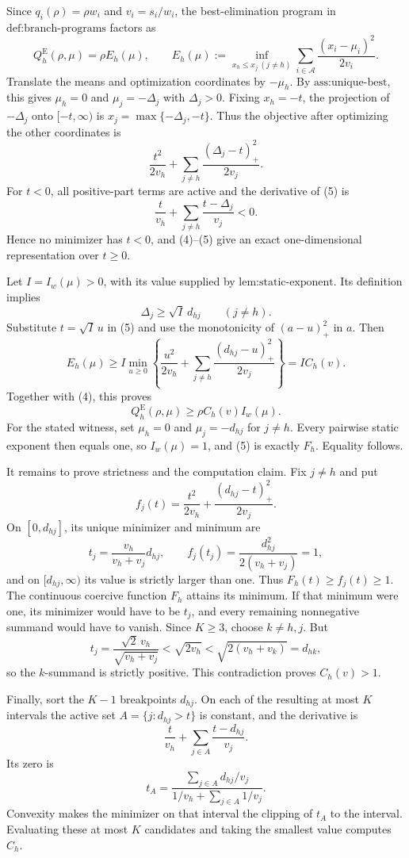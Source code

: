Since \(q_i(\rho)=\rho w_i\) and \(v_i=s_i/w_i\), the best-elimination program in \(\text{def:branch-programs}\) factors as
\[
 Q_h^{\mathrm E}(\rho,\mu)=\rho E_h(\mu),\qquad
 E_h(\mu):=\inf_{x_h\leq x_j\ (j\ne h)}
 \sum_{i\in\mathcal A}\frac{(x_i-\mu_i)^2}{2v_i}. \tag{4}
\]
Translate the means and optimization coordinates by \(-\mu_h\). By \(\text{ass:unique-best}\), this gives \(\mu_h=0\) and \(\mu_j=-\Delta_j\) with \(\Delta_j>0\). Fixing \(x_h=-t\), the projection of \(-\Delta_j\) onto \([-t,\infty)\) is \(x_j=\max\{-\Delta_j,-t\}\). Thus the objective after optimizing the other coordinates is
\[
 \frac{t^2}{2v_h}+\sum_{j\ne h}\frac{(\Delta_j-t)_+^2}{2v_j}. \tag{5}
\]
For \(t<0\), all positive-part terms are active and the derivative of (5) is
\[
 \frac{t}{v_h}+\sum_{j\ne h}\frac{t-\Delta_j}{v_j}<0.
\]
Hence no minimizer has \(t<0\), and (4)--(5) give an exact one-dimensional representation over \(t\geq0\).

Let \(I=I_w(\mu)>0\), with its value supplied by \(\text{lem:static-exponent}\). Its definition implies
\[
 \Delta_j\geq \sqrt I\,d_{hj}\qquad(j\ne h).
\]
Substitute \(t=\sqrt I\,u\) in (5) and use the monotonicity of \((a-u)_+^2\) in \(a\). Then
\[
 E_h(\mu)
 \geq I\min_{u\geq0}\left\{\frac{u^2}{2v_h}
 +\sum_{j\ne h}\frac{(d_{hj}-u)_+^2}{2v_j}\right\}
 =I C_h(v).
\]
Together with (4), this proves
\[
 Q_h^{\mathrm E}(\rho,\mu)\geq\rho C_h(v)I_w(\mu).
\]
For the stated witness, set \(\mu_h=0\) and \(\mu_j=-d_{hj}\) for \(j\ne h\). Every pairwise static exponent then equals one, so \(I_w(\mu)=1\), and (5) is exactly \(F_h\). Equality follows.

It remains to prove strictness and the computation claim. Fix \(j\ne h\) and put
\[
 f_j(t)=\frac{t^2}{2v_h}+\frac{(d_{hj}-t)_+^2}{2v_j}.
\]
On \([0,d_{hj}]\), its unique minimizer and minimum are
\[
 t_j=\frac{v_h}{v_h+v_j}d_{hj},
 \qquad
 f_j(t_j)=\frac{d_{hj}^2}{2(v_h+v_j)}=1,
\]
and on \([d_{hj},\infty)\) its value is strictly larger than one. Thus \(F_h(t)\geq f_j(t)\geq1\). The continuous coercive function \(F_h\) attains its minimum. If that minimum were one, its minimizer would have to be \(t_j\), and every remaining nonnegative summand would have to vanish. Since \(K\geq3\), choose \(k\ne h,j\). But
\[
 t_j=\frac{\sqrt2\,v_h}{\sqrt{v_h+v_j}}
 <\sqrt{2v_h}<\sqrt{2(v_h+v_k)}=d_{hk},
\]
so the \(k\)-summand is strictly positive. This contradiction proves \(C_h(v)>1\).

Finally, sort the \(K-1\) breakpoints \(d_{hj}\). On each of the resulting at most \(K\) intervals the active set \(A=\{j:d_{hj}>t\}\) is constant, and the derivative is
\[
 \frac{t}{v_h}+\sum_{j\in A}\frac{t-d_{hj}}{v_j}.
\]
Its zero is
\[
 t_A=\frac{\sum_{j\in A}d_{hj}/v_j}
 {1/v_h+\sum_{j\in A}1/v_j}.
\]
Convexity makes the minimizer on that interval the clipping of \(t_A\) to the interval. Evaluating these at most \(K\) candidates and taking the smallest value computes \(C_h\).

